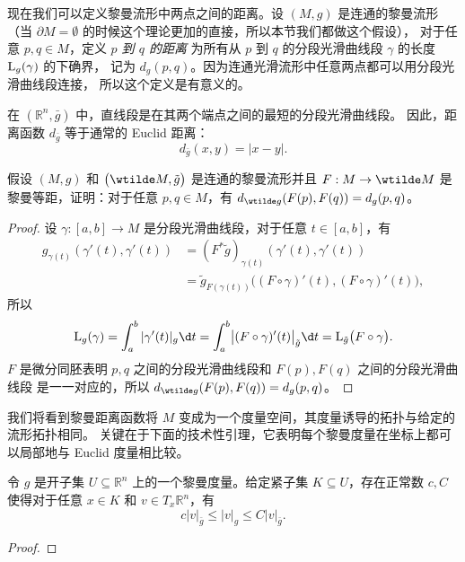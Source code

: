现在我们可以定义黎曼流形中两点之间的距离。设 $(M,g)$ 是连通的黎曼流形
（当 $\partial M=\emptyset$ 的时候这个理论更加的直接，所以本节我们都做这个假设），
对于任意 $p,q\in M$，定义 \emph{$p$ 到 $q$ 的距离} 为所有从 $p$
到 $q$ 的分段光滑曲线段 $\gamma$ 的长度 ${\mathrm{L}}_g(\gamma)$ 的下确界，
记为 $d_g(p,q)$。因为连通光滑流形中任意两点都可以用分段光滑曲线段连接，
所以这个定义是有意义的。

\begin{example}
  在 $(\mathbb{R}^n,\bar g)$ 中，直线段是在其两个端点之间的最短的分段光滑曲线段。
  因此，距离函数 $d_{\bar g}$ 等于通常的 Euclid 距离：
  \[
    d_{\bar g}(x,y)=|x-y|.
  \]
\end{example}

\begin{exercise}
  假设 $(M,g)$ 和 $\bigl(\wtilde M,\tilde g\bigr)$ 是连通的黎曼流形并且
  $F:M\to\wtilde M$ 是黎曼等距，证明：对于任意 $p,q\in M$，有
  $d_{\wtilde g}(F(p),F(q))=d_g(p,q)$。
\end{exercise}
\begin{proof}
  设 $\gamma:[a,b]\to M$ 是分段光滑曲线段，对于任意 $t\in [a,b]$，有
  \begin{align*}
    g_{\gamma(t)}(\gamma'(t),\gamma'(t))&=(F^*\tilde g)_{\gamma(t)}(\gamma'(t),\gamma'(t))\\
    &=\tilde g_{F(\gamma(t))}\bigl((F\circ\gamma)'(t),(F\circ\gamma)'(t)\bigr),
  \end{align*}
  所以
  \[
    \LL_g(\gamma)=\int_a^b |\gamma'(t)|_g \d t
    =\int_a^b \bigl|(F\circ\gamma)'(t)\bigr|_{\tilde g} \d t=
    \LL_{\tilde g}\bigl(F\circ\gamma\bigr).
  \]
  $F$ 是微分同胚表明 $p,q$ 之间的分段光滑曲线段和 $F(p),F(q)$ 之间的分段光滑曲线段
  是一一对应的，所以 $d_{\wtilde g}(F(p),F(q))=d_g(p,q)$。
\end{proof}

我们将看到黎曼距离函数将 $M$ 变成为一个度量空间，其度量诱导的拓扑与给定的流形拓扑相同。
关键在于下面的技术性引理，它表明每个黎曼度量在坐标上都可以局部地与 Euclid 度量相比较。

\begin{lemma}\label{lemma:compare with euclid metric}
  令 $g$ 是开子集 $U\subseteq \mathbb{R}^n$ 上的一个黎曼度量。给定紧子集 
  $K\subseteq U$，存在正常数 $c,C$ 使得对于任意 $x\in K$ 和 $v\in T_x \mathbb{R}^n$，有
  \[
    c|v|_{\bar g}\leq |v|_g\leq C|v|_{\bar g}.  
  \]
\end{lemma}
\begin{proof}
  
\end{proof}

